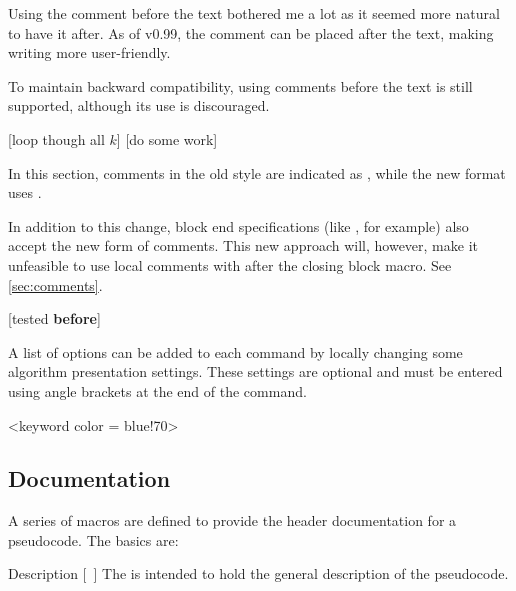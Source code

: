 \documentclass[a4paper, 11pt]{article}
\begin{document}
Using the comment before the text bothered me a lot as it seemed more natural to have it after. As of v0.99, the comment can be placed after the text, making writing more user-friendly.

To maintain backward compatibility, using comments before the text is still supported, although its use is discouraged.

\begin{tcblisting}{}
    \begin{algorithmic}
        [loop though all $k$]
            [do some work]
        \EndWhile
    \end{algorithmic}
\end{tcblisting}

In this section, comments in the old style are indicated as , while the new format uses .

In addition to this change, block end specifications (like , for example) also accept the new form of comments. This new approach will, however, make it unfeasible to use local comments with  after the closing block macro. See \cref{sec:comments}.

\begin{tcblisting}{}
    \begin{algorithmic}
            [tested \textbf{before}]
    \end{algorithmic}
\end{tcblisting}

A list of options can be added to each command by locally changing some algorithm presentation settings. These settings are optional and must be entered using angle brackets at the end of the command.

\begin{tcblisting}{}
    \begin{algorithmic}
            <keyword color = blue!70>
            \EndWhile
        \EndIf
    \end{algorithmic}
\end{tcblisting}

\subsection{Documentation}\label{sec:documentation}
A series of macros are defined to provide the header documentation for a pseudocode. The basics are:
\begin{macro}{Description}
    [~]
    The  is intended to hold the general description of the pseudocode.
\end{macro}
\end{document}
